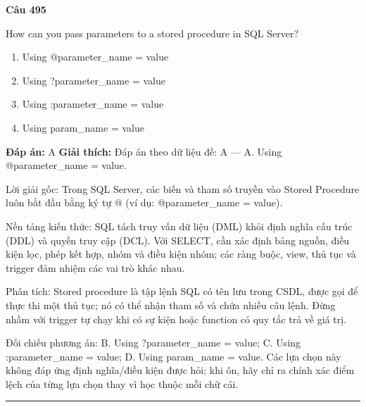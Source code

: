 \documentclass[11pt,a4paper]{article}
\newenvironment{question}[1]{%
  \par\vspace{1em}\noindent\textbf{\large Câu #1}\par\vspace{0.4em}
}{%
  \par\vspace{1em}\hrule\vspace{0.6em}
}
\newenvironment{choices}{%
  \begin{enumerate}[label=\textbf{\Alph*.},leftmargin=2.2em,itemsep=2pt,topsep=3pt]
}{%
  \end{enumerate}
}
\newcommand{\choice}{\item}
\begin{document}
\begin{question}{495}
How can you pass parameters to a stored procedure in SQL Server?
\begin{choices}
\choice Using @parameter_name = value
\choice Using ?parameter_name = value
\choice Using :parameter_name = value
\choice Using param_name = value
\end{choices}
\textbf{Đáp án:} A
\textbf{Giải thích:} Đáp án theo dữ liệu đề: A — A. Using @parameter_name = value.

Lời giải gốc: Trong SQL Server, các biến và tham số truyền vào Stored Procedure luôn bắt đầu bằng ký tự @ (ví dụ: @parameter_name = value).

Nền tảng kiến thức: SQL tách truy vấn dữ liệu (DML) khỏi định nghĩa cấu trúc (DDL) và quyền truy cập (DCL). Với SELECT, cần xác định bảng nguồn, điều kiện lọc, phép kết hợp, nhóm và điều kiện nhóm; các ràng buộc, view, thủ tục và trigger đảm nhiệm các vai trò khác nhau.

Phân tích: Stored procedure là tập lệnh SQL có tên lưu trong CSDL, được gọi để thực thi một thủ tục; nó có thể nhận tham số và chứa nhiều câu lệnh. Đừng nhầm với trigger tự chạy khi có sự kiện hoặc function có quy tắc trả về giá trị.

Đối chiếu phương án: B. Using ?parameter_name = value; C. Using :parameter_name = value; D. Using param_name = value. Các lựa chọn này không đáp ứng định nghĩa/điều kiện được hỏi; khi ôn, hãy chỉ ra chính xác điểm lệch của từng lựa chọn thay vì học thuộc mỗi chữ cái.
\end{question}
\end{document}
